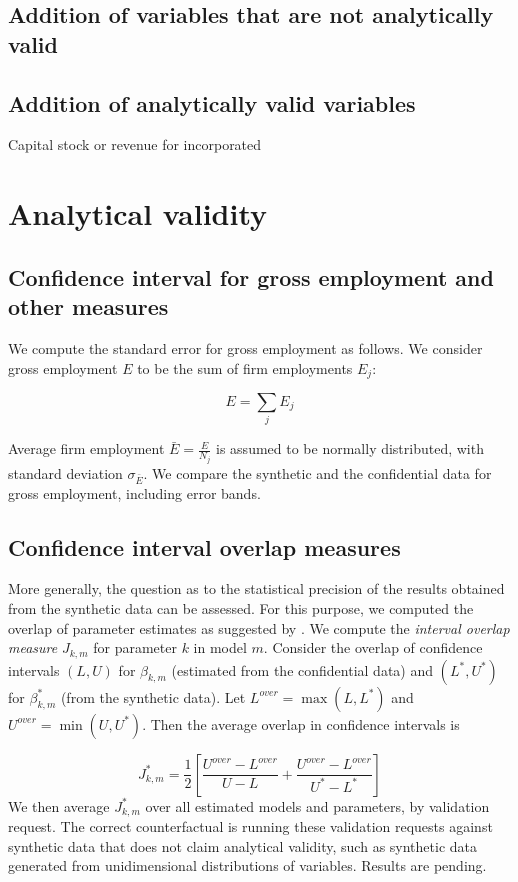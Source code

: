 \documentclass{article}
\begin{document}
\subsection{Addition of variables that are not analytically valid}
\subsection{Addition of analytically valid variables}
Capital stock or revenue for incorporated 

\newpage
{}
\section{Analytical validity}

\subsection{Confidence interval for gross employment and other measures}
We compute the standard error for gross employment as follows. We consider gross employment $E$ to be the sum of firm employments $E_j$:

\begin{equation}
E = \sum_j E_j
\end{equation}

Average firm employment $\bar{E} = \frac{E}{N_j}$ is assumed to be normally distributed, with standard deviation $\sigma_{\bar{E}}$. We compare the synthetic and the confidential data for gross employment, including error bands.

\subsection{Confidence interval overlap measures}

More generally, the question as to the statistical precision of the results obtained from the synthetic data can be assessed. For this purpose, we computed the overlap of parameter estimates  as suggested by \cite{tas2006}. We compute  the \emph{interval 
	overlap measure} $J_{k,m}$ for parameter $k$ in model $m$. Consider the overlap of confidence intervals $(L,U)$ for $\beta_{k,m}$ (estimated from the confidential data) and $(L^{*},U^{*})$ for $\beta_{k,m}^*$ (from the synthetic data). Let $L^{over} = \max (L,L^{*} )$ and $U^{over} = \min (U,U^{*})$. Then the average overlap in confidence intervals is

$$
J_{k,m}^{*} = \frac{1}{2} \left [ \frac{U^{over} - L^{over}}{U-L} + \frac{U^{over} - L^{over}}{U^*-L ^*}        \right ]
$$
We then average $J_{k,m}^{*}$ over all estimated models and parameters, by validation request. The correct counterfactual is running these validation requests against synthetic data that does not claim analytical validity, such as synthetic data generated from unidimensional distributions of variables. Results are pending.
\end{document}
